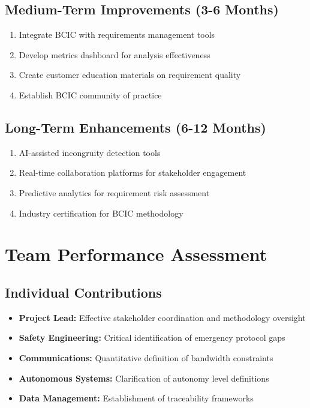 \documentclass[12pt,a4paper]{article}
\begin{document}
\subsection{Medium-Term Improvements (3-6 Months)}
\begin{enumerate}
    \item Integrate BCIC with requirements management tools
    \item Develop metrics dashboard for analysis effectiveness
    \item Create customer education materials on requirement quality
    \item Establish BCIC community of practice
\end{enumerate}

\subsection{Long-Term Enhancements (6-12 Months)}
\begin{enumerate}
    \item AI-assisted incongruity detection tools
    \item Real-time collaboration platforms for stakeholder engagement
    \item Predictive analytics for requirement risk assessment
    \item Industry certification for BCIC methodology
\end{enumerate}

\section{Team Performance Assessment}

\subsection{Individual Contributions}
\begin{itemize}
    \item \textbf{Project Lead:} Effective stakeholder coordination and methodology oversight
    \item \textbf{Safety Engineering:} Critical identification of emergency protocol gaps
    \item \textbf{Communications:} Quantitative definition of bandwidth constraints
    \item \textbf{Autonomous Systems:} Clarification of autonomy level definitions
    \item \textbf{Data Management:} Establishment of traceability frameworks
\end{itemize}
\end{document}
